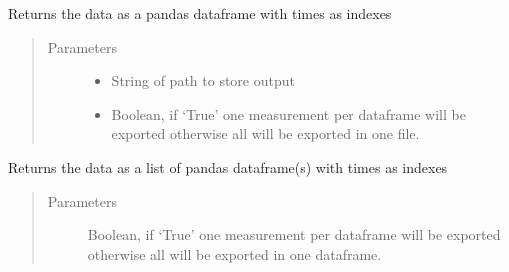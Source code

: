 \documentclass[letterpaper,10pt,english]{sphinxmanual}
\begin{document}
\begin{fulllineitems}
\begin{fulllineitems}
\begin{quote}
\begin{description}
\begin{itemize}
\end{itemize}

\end{description}\end{quote}

\end{fulllineitems}


\begin{fulllineitems}
\label{\detokenize{platelib:platelib.plateread.Plate_data.to_a_csv}}
Returns the data as a pandas dataframe with times as indexes
\begin{quote}\begin{description}
\item[{Parameters}] \leavevmode\begin{itemize}
\item {} 
 \textendash{} String of path to store output

\item {} 
 \textendash{} Boolean, if ‘True’ one measurement per dataframe will be exported otherwise all will be exported in one file.

\end{itemize}

\end{description}\end{quote}

\end{fulllineitems}


\begin{fulllineitems}
\label{\detokenize{platelib:platelib.plateread.Plate_data.to_a_dataframe}}
Returns the data as a list of pandas dataframe(s) with times as indexes
\begin{quote}\begin{description}
\item[{Parameters}] \leavevmode
{} \textendash{} Boolean, if ‘True’ one measurement per dataframe will be exported otherwise all will be exported in one dataframe.

\end{description}\end{quote}

\end{fulllineitems}


\end{fulllineitems}
\end{document}
